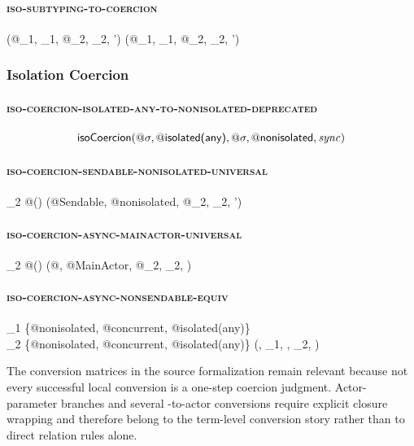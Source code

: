 \paragraph{\textsc{iso-subtyping-to-coercion}}

  {\isoSubtyping(@\sigma_1, \iota_1, @\sigma_2, \iota_2, \alpha')}
  {\isoCoercion(@\sigma_1, \iota_1, @\sigma_2, \iota_2, \alpha')}

\subsubsection{Isolation Coercion}

\paragraph{\textsc{iso-coercion-isolated-any-to-nonisolated-deprecated}}
\[
  \textsf{isoCoercion}(@\sigma, @\textsf{isolated(any)}, @\sigma, @\textsf{nonisolated}, \mathit{sync})
\]

\paragraph{\textsc{iso-coercion-sendable-nonisolated-universal}}

  {\iota_2 \neq @\isolated()}
  {\isoCoercion(@\textsf{Sendable}, @\textsf{nonisolated}, @\sigma_2, \iota_2, \alpha')}

\paragraph{\textsc{iso-coercion-async-mainactor-universal}}

  {\iota_2 \neq @\isolated()}
  {\isoCoercion(@\sigma, @\textsf{MainActor}, @\sigma_2, \iota_2, )}

\paragraph{\textsc{iso-coercion-async-nonsendable-equiv}}

  {\iota_1 \in \{@\textsf{nonisolated}, @\textsf{concurrent}, @\textsf{isolated(any)}\} \\
   \iota_2 \in \{@\textsf{nonisolated}, @\textsf{concurrent}, @\textsf{isolated(any)}\}}
  {\isoCoercion(\cdot, \iota_1, \cdot, \iota_2, )}

The conversion matrices in the source formalization remain relevant because not every successful local conversion is a one-step coercion judgment. Actor-parameter branches and several -to-actor conversions require explicit closure wrapping and therefore belong to the term-level conversion story rather than to direct relation rules alone.
